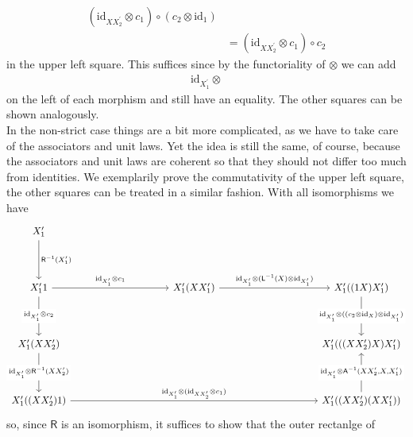 \begin{prf}
\begin{enumerate}
\begin{align*}
  \left(
    \mathrm{id}_{X X_{2}^{\prime}}
    \otimes
    c_{1}
  \right)
  \circ
  \left(
    c_{2}
    \otimes
    \mathrm{id}_{1}
  \right)
  \\
  &=
  \left(
    \mathrm{id}_{X X_{2}^{\prime}}
    \otimes
    c_{1}
  \right)
  \circ
  c_{2}
\end{align*}
in the upper left square. This suffices since by the functoriality of $\otimes$ we can add
\begin{align*}
  \mathrm{id}_{X_{1}^{\prime}}
  \otimes
\end{align*}
on the left of each morphism and still have an equality. The other squares can be shown analogously.
\\
In the non-strict case things are a bit more complicated, as we have to take care of the associators and unit laws. Yet the idea is still the same, of course, because the associators and unit laws are coherent so that they should not differ too much from identities. We exemplarily prove the commutativity of the upper left square, the other squares can be treated in a similar fashion. With all isomorphisms we have
\begin{equation*}
\begin{tikzcd}[row sep=4em,column sep=10em]
  X_{1}^{\prime}
  \ar{d}{\mathsf{R}^{-1}(X_{1}^{\prime})}
  &
  &
  \\
  X_{1}^{\prime} 1
  \ar{r}{\mathrm{id}_{X_{1}^{\prime}} \otimes c_{1}}
  \ar{d}[description]{\mathrm{id}_{X_{1}^{\prime}} \otimes c_{2}}
  &
  X_{1}^{\prime} (X X_{1}^{\prime})
  \ar{r}{\mathrm{id}_{X_{1}^{\prime}} \otimes (\mathsf{L}^{-1}(X)  \otimes  \mathrm{id}_{X_{1}^{\prime}})}
  &
  X_{1}^{\prime} ((1 X) X_{1}^{\prime})
  \ar{d}[description]{\mathrm{id}_{X_{1}^{\prime}} \otimes ((c_{2} \otimes \mathrm{id}_{X}) \otimes \mathrm{id}_{X_{1}^{\prime}})}
  \\
  X_{1}^{\prime} (X X_{2}^{\prime})
  \ar{d}[description]{\mathrm{id}_{X_{1}^{\prime}} \otimes \mathsf{R}^{-1}(X X_{2}^{\prime})}
  &
  &
  X_{1}^{\prime} (((X X_{2}^{\prime}) X) X_{1}^{\prime})
  \\
  X_{1}^{\prime} ((X X_{2}^{\prime}) 1)
  \ar{rr}{\mathrm{id}_{X_{1}^{\prime}} \otimes (\mathrm{id}_{X X_{2}^{\prime}} \otimes c_{1})}
  &
  &
  X_{1}^{\prime} ((X X_{2}^{\prime}) (X X_{1}^{\prime}))
  \ar{u}[description]{\mathrm{id}_{X_{1}^{\prime}} \otimes  \mathsf{A}^{-1}(X X_{2}^{\prime},X,X_{1}^{\prime})}
\end{tikzcd}
\end{equation*}
so, since $\mathsf{R}$ is an isomorphism, it suffices to show that the outer rectanlge of

\end{enumerate}
\end{prf}
